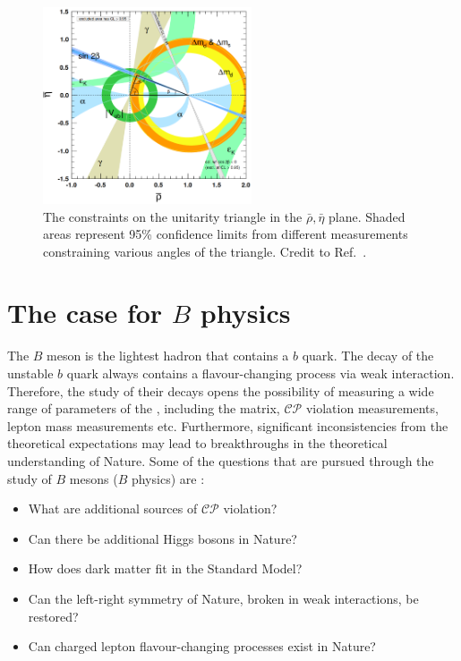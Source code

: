 \begin{figure}
    \centering
    \includegraphics[width=0.55\textwidth]{figures/sm_theory/unitarity_triangle.png}
    \caption{\label{fig:unitarity_triangle}The constraints on the unitarity triangle in the $\bar{\rho},\bar{\eta}$ plane.
    Shaded areas represent  95\% confidence limits from different measurements constraining various angles of the triangle.
    Credit to Ref.~\cite{Workman:2022ynf}.
    }
\end{figure}

\section{The case for \texorpdfstring{$B$}{B} physics}\label{sec:bphysics_case}

The $B$ meson is the lightest hadron that contains a $b$ quark.
The decay of the unstable $b$ quark always contains a flavour-changing process via weak interaction.
Therefore, the study of their decays opens the possibility of measuring a wide range of parameters of the \SM, including the \CKM matrix, $\mathcal{CP}$ violation measurements, lepton mass measurements etc.
Furthermore, significant inconsistencies from the theoretical expectations may lead to breakthroughs in the theoretical understanding of Nature.
Some of the questions that are pursued through the study of $B$ mesons ($B$ physics) are \cite{Belle-II:2018jsg}:
\begin{itemize}
    \item What are additional sources of $\mathcal{CP}$ violation?
    \item Can there be additional Higgs bosons in Nature?
    \item How does dark matter fit in the Standard Model?
    \item Can the left-right symmetry of Nature, broken in weak interactions, be restored?
    \item Can charged lepton flavour-changing processes exist in Nature?
\end{itemize}

